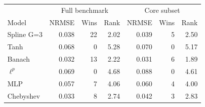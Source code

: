 \begin{tabular}{lrrrrrr}
\toprule
& \multicolumn{3}{c}{Full benchmark} & \multicolumn{3}{c}{Core subset} \\
Model & NRMSE & Wins & Rank & NRMSE & Wins & Rank \\
\midrule
Spline G=3 & 0.038 & 22 & 2.02 & 0.039 & 5 & 2.50 \\
Tanh & 0.068 & 0 & 5.28 & 0.070 & 0 & 5.17 \\
Banach & 0.032 & 13 & 2.22 & 0.031 & 6 & 1.89 \\
$\ell^p$ & 0.069 & 0 & 4.68 & 0.088 & 0 & 4.61 \\
MLP & 0.057 & 7 & 4.06 & 0.060 & 4 & 4.00 \\
Chebyshev & 0.033 & 8 & 2.74 & 0.042 & 3 & 2.83 \\
\bottomrule
\end{tabular}
